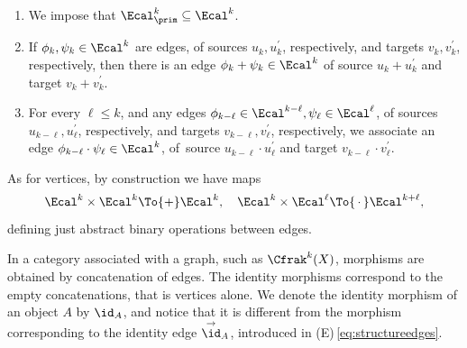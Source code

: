 \begin{enumerate}
\begin{enumerate}
\begin{enumerate}
\item\label{item:formal-iso-5} \emph{Whitney formula}. For every exact sequence of vector bundles $0\to E^{\prime}\to E\to E^{\bis}\to 0$ and every integer $k \geq 0$, two edges in $\Ecal^k_{\prim}$:
\begin{displaymath}
\xymatrix@C=1.2cm{
\cfrak_{k}(E) \ar@<.8ex>[r] &\ar@<.8ex>[l]\sum_{i=0}^{k} \cfrak_{i}(E^{\prime}) \cdot \cfrak_{k-i}(E^{\bis}).
}
\end{displaymath}
Here, we follow the convention \eqref{eq:convention-sum} for the reiterated addition.
\item \emph{Isomorphisms of vector bundles}. For every isomorphism of vector bundles $\varphi\colon E\!\to\! F$ and every integer $k \!\geq\! 0$, two edges in~$\Ecal^k_{\prim}$:
\begin{displaymath}
\xymatrix@C=1.2cm{
\cfrak_{k}(E) \ar@<.8ex>[r]^-{[\varphi]_k} & \ar@<.8ex>[l]^-{[\varphi]^{-1}_k} \cfrak_{k}(F).
}
\end{displaymath}
\end{enumerate}
\end{enumerate}
\item We impose that $\Ecal^k_{\prim} \subseteq \Ecal^k$.

\item If $\phi_k, \psi_k \in \Ecal^k$ are edges, of sources $u_{k}, u_{k}^{\prime}$, respectively, and targets $v_{k},v_{k}^{\prime}$, respectively, then there is an edge $\phi_k + \psi_k \in \Ecal^k$ of source $u_{k}+u_{k}^{\prime}$ and target $v_{k}+v_{k}^{\prime}$.

\item For every $\ell\leq k$, and any edges $\phi_{k-\ell} \in \Ecal^{k-\ell}, \psi_\ell \in \Ecal^{\ell}$, of sources $u_{k-\ell}, u_{\ell}^{\prime}$, respectively, and targets $v_{k-\ell},v_{\ell}^{\prime}$, respectively, we associate an edge $\phi_{k-\ell} \cdot \psi_\ell \in \Ecal^{k}$, of~source $u_{k-\ell}\cdot u_{\ell}^{\prime}$ and target $v_{k-\ell}\cdot v_{\ell}^{\prime}$.
\end{enumerate}

As for vertices, by construction we have maps
\begin{equation}\label{eq:operations-edges}
\Ecal^{k}\times\Ecal^{k}\To{+}\Ecal^{k},\quad \Ecal^{k}\times\Ecal^{\ell}\To{\,\cdot\,}\Ecal^{k+\ell},
\end{equation}
defining just abstract binary operations between edges.

In a category associated with a graph, such as $\Cfrak^{k}(X)$, morphisms are obtained by concatenation of edges. The identity morphisms correspond to the empty concatenations, that is vertices alone. We denote the identity morphism of an object $A$ by $\id_A$, and notice that it is different from the morphism corresponding to the identity edge $\overset{\to}{\id}_A$, introduced in (E)\,\eqref{eq:structureedges}.


